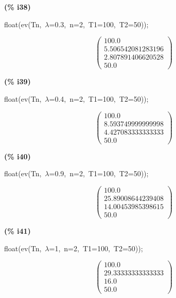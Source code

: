 \documentclass[fleqn]{article}
\begin{document}
\noindent
\begin{minipage}[t]{4.000000em}\color{red}\bfseries
(\% i38)	
\end{minipage}
\begin{minipage}[t]{\textwidth}\color{blue}
float(ev(Tn,\ \ensuremath{\lambda}=0.3,\ n=2,\ T1=100,\ T2=50));
\end{minipage}
\[\displaystyle \tag{\% o38} 
\begin{pmatrix}100.0\\
5.506542081283196\\
2.807891406620528\\
50.0\end{pmatrix}\mbox{}
\]


\noindent
\begin{minipage}[t]{4.000000em}\color{red}\bfseries
(\% i39)	
\end{minipage}
\begin{minipage}[t]{\textwidth}\color{blue}
float(ev(Tn,\ \ensuremath{\lambda}=0.4,\ n=2,\ T1=100,\ T2=50));
\end{minipage}
\[\displaystyle \tag{\% o39} 
\begin{pmatrix}100.0\\
8.593749999999998\\
4.427083333333333\\
50.0\end{pmatrix}\mbox{}
\]


\noindent
\begin{minipage}[t]{4.000000em}\color{red}\bfseries
(\% i40)	
\end{minipage}
\begin{minipage}[t]{\textwidth}\color{blue}
float(ev(Tn,\ \ensuremath{\lambda}=0.9,\ n=2,\ T1=100,\ T2=50));
\end{minipage}
\[\displaystyle \tag{\% o40} 
\begin{pmatrix}100.0\\
25.89008644239408\\
14.00453985398615\\
50.0\end{pmatrix}\mbox{}
\]


\noindent
\begin{minipage}[t]{4.000000em}\color{red}\bfseries
(\% i41)	
\end{minipage}
\begin{minipage}[t]{\textwidth}\color{blue}
float(ev(Tn,\ \ensuremath{\lambda}=1,\ n=2,\ T1=100,\ T2=50));
\end{minipage}
\[\displaystyle \tag{\% o41} 
\begin{pmatrix}100.0\\
29.33333333333333\\
16.0\\
50.0\end{pmatrix}\mbox{}
\]
\end{document}
